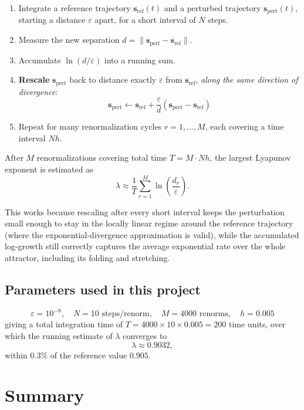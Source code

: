 \documentclass[11pt]{article}
\begin{document}
\begin{enumerate}
  \item Integrate a reference trajectory $\mathbf{s}_{\text{ref}}(t)$ and a
        perturbed trajectory $\mathbf{s}_{\text{pert}}(t)$, starting a
        distance $\varepsilon$ apart, for a short interval of $N$ steps.
  \item Measure the new separation $d = \lVert \mathbf{s}_{\text{pert}} -
        \mathbf{s}_{\text{ref}} \rVert$.
  \item Accumulate $\ln(d / \varepsilon)$ into a running sum.
  \item \textbf{Rescale} $\mathbf{s}_{\text{pert}}$ back to distance exactly
        $\varepsilon$ from $\mathbf{s}_{\text{ref}}$, \emph{along the same
        direction of divergence}:
        \[
        \mathbf{s}_{\text{pert}} \leftarrow \mathbf{s}_{\text{ref}} +
        \frac{\varepsilon}{d}\left(\mathbf{s}_{\text{pert}} -
        \mathbf{s}_{\text{ref}}\right)
        \]
  \item Repeat for many renormalization cycles $r = 1, \dots, M$, each
        covering a time interval $N h$.
\end{enumerate}

After $M$ renormalizations covering total time $T = M \cdot N h$, the
largest Lyapunov exponent is estimated as
\[
\lambda \approx \frac{1}{T} \sum_{r=1}^{M} \ln\!\left(\frac{d_r}{\varepsilon}\right).
\]

This works because rescaling after every short interval keeps the
perturbation small enough to stay in the locally linear regime around the
reference trajectory (where the exponential-divergence approximation is
valid), while the accumulated log-growth still correctly captures the
average exponential rate over the whole attractor, including its folding
and stretching.

\subsection*{Parameters used in this project}
\[
\varepsilon = 10^{-8}, \quad N = 10 \text{ steps/renorm}, \quad
M = 4000 \text{ renorms}, \quad h = 0.005
\]
giving a total integration time of $T = 4000 \times 10 \times 0.005 = 200$
time units, over which the running estimate of $\lambda$ converges to
\[
\lambda \approx 0.9032,
\]
within $0.3\%$ of the reference value $0.905$.

\section{Summary}
\end{document}
